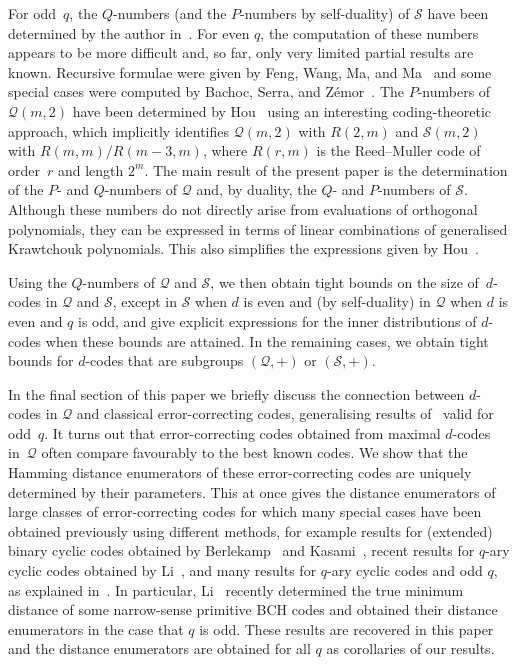 \documentclass[10pt]{article}
\theoremstyle{definition}
\newcommand{\Q}{\mathscr{Q}}
\renewcommand{\S}{\mathscr{S}}
\begin{document}
For odd~$q$, the $Q$-numbers (and the $P$-numbers by self-duality) of $\S$ have been determined by the author in~\cite{Sch2015}. For even $q$, the computation of these numbers appears to be more difficult and, so far, only very limited partial results are known. Recursive formulae were given by Feng, Wang, Ma, and Ma~\cite{FenWanMaMa2008} and some special cases were computed by Bachoc, Serra, and Z\'emor~\cite{BacSerZem2017}. The $P$-numbers of $\Q(m,2)$ have been determined by Hou~\cite{Hou2001} using an interesting coding-theoretic approach, which implicitly identifies $\Q(m,2)$ with $R(2,m)$ and $\S(m,2)$ with $R(m,m)/R(m-3,m)$, where $R(r,m)$ is the Reed--Muller code of order~$r$ and length $2^m$. The main result of the present paper is the determination of the $P$- and $Q$-numbers of $\Q$ and, by duality, the $Q$- and $P$-numbers of $\S$. Although these numbers do not directly arise from evaluations of orthogonal polynomials, they can be expressed in terms of linear combinations of generalised Krawtchouk polynomials. This also simplifies the expressions given by Hou~\cite{Hou2001}.
\par
Using the $Q$-numbers of $\Q$ and $\S$, we then obtain tight bounds on the size of~$d$-codes in $\Q$ and $\S$, except in $\S$ when $d$ is even and (by self-duality) in $\Q$ when $d$ is even and $q$ is odd, and give explicit expressions for the inner distributions of $d$-codes when these bounds are attained. In the remaining cases, we obtain tight bounds for $d$-codes that are subgroups $(\Q,+)$ or $(\S,+)$.
\par
In the final section of this paper we briefly discuss the connection between $d$-codes in $\Q$ and classical error-correcting codes, generalising results of~\cite{Sch2015} valid for odd~$q$. 
It turns out that error-correcting codes obtained from maximal $d$-codes in~$\Q$ often compare favourably to the best known codes. We show that the Hamming distance enumerators of these error-correcting codes are uniquely determined by their parameters. This at once gives the distance enumerators of large classes of error-correcting codes 
for which many special cases have been obtained previously using different methods, for example results for (extended) binary cyclic codes obtained by Berlekamp~\cite{Ber1970} and Kasami~\cite{Kas1971}, recent results for $q$-ary cyclic codes obtained by Li~\cite{Li2017}, and many results for $q$-ary cyclic codes and odd $q$, as explained in~\cite{Sch2015}. In particular, Li~\cite{Li2017} recently determined the true minimum distance of some narrow-sense primitive BCH codes and obtained their distance enumerators in the case that $q$ is odd. These results are recovered in this paper and the distance enumerators are obtained for all $q$ as corollaries of our results.
\end{document}
